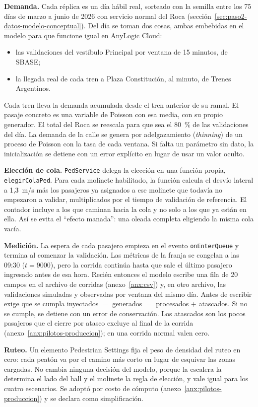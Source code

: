 \textbf{Demanda.} Cada réplica es un día hábil real, sorteado con la semilla entre los 75 días de marzo a junio de
2026 con servicio normal del Roca (sección~\ref{sec:paso2-datos-modelo-conceptual}). Del día se toman dos cosas,
ambas embebidas en el modelo para que funcione igual en AnyLogic Cloud:
\begin{itemize}
  \item las validaciones del vestíbulo Principal por ventana de 15 minutos, de SBASE;
  \item la llegada real de cada tren a Plaza Constitución, al minuto, de Trenes Argentinos.
\end{itemize}
Cada tren lleva la demanda acumulada desde el tren anterior de su ramal. El pasaje concreto es una variable de
Poisson con esa media, con su propio generador. El total del Roca se reescala para que sea el 80~\% de las
validaciones del día. La demanda de la calle se genera por adelgazamiento (\emph{thinning}) de un proceso de
Poisson con la tasa de cada ventana. Si falta un parámetro sin dato, la inicialización se detiene con un error
explícito en lugar de usar un valor oculto.

\textbf{Elección de cola.} \texttt{PedService} delega la elección en una función propia,
\texttt{elegirColaPed}. Para cada molinete habilitado, la función calcula el desvío lateral a 1,3~m/s más
los pasajeros ya asignados a ese molinete que todavía no empezaron a validar, multiplicados por el tiempo
de validación de referencia. El contador incluye a los que caminan hacia la cola y no solo a los que ya
están en ella. Así se evita el \enquote{efecto manada}: una oleada completa eligiendo la misma cola vacía.

\textbf{Medición.} La espera de cada pasajero empieza en el evento \texttt{onEnterQueue} y termina al
comenzar la validación. Las métricas de la franja se congelan a las 09:30 ($t = 9000$), pero la corrida
continúa hasta que sale el último pasajero ingresado antes de esa hora. Recién entonces el modelo escribe
una fila de 20 campos en el archivo de corridas (anexo~\ref{anx:csv}) y, en otro archivo, las validaciones
simuladas y observadas por ventana del mismo día. Antes de escribir exige que se cumpla
inyectados $=$ generados $=$ procesados $+$ atascados. Si no se cumple, se detiene con un error de
conservación. Los atascados son los pocos pasajeros que el cierre por atasco excluye al final de la corrida
(anexo~\ref{anx:pilotos-produccion}); en una corrida normal valen cero.

\textbf{Ruteo.} Un elemento Pedestrian Settings fija el peso de densidad del ruteo en cero: cada peatón va por
el camino más corto en lugar de esquivar las zonas cargadas. No cambia ninguna decisión del modelo, porque la
escalera la determina el lado del hall y el molinete la regla de elección, y vale igual para los cuatro
escenarios. Se adoptó por costo de cómputo (anexo~\ref{anx:pilotos-produccion}) y se declara como simplificación.

